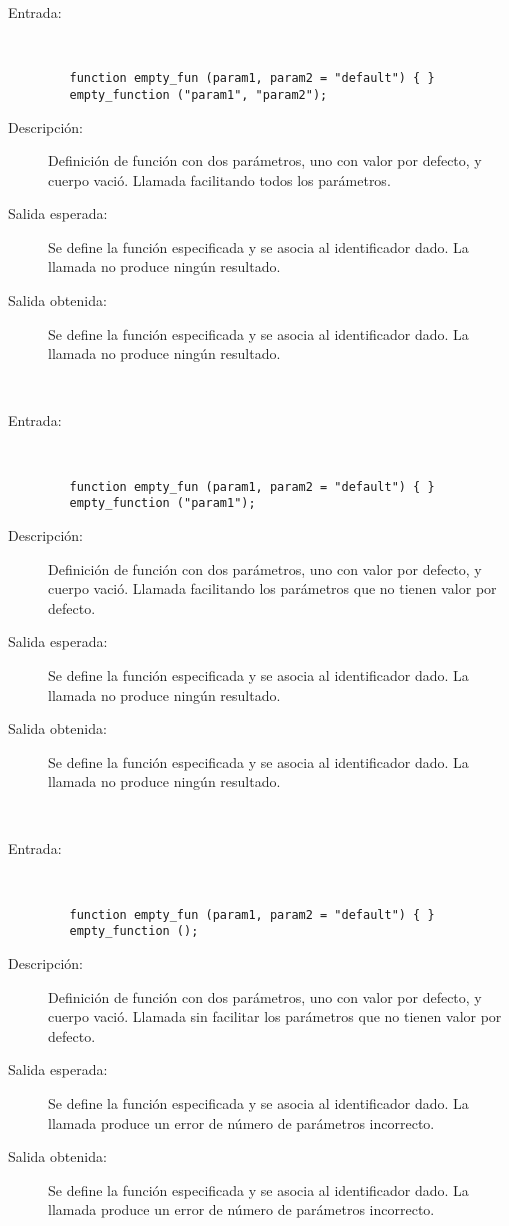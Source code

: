 	\begin{description}
		\item [Entrada:] \hfill \\
\begin{lstlisting}
   function empty_fun (param1, param2 = "default") { } 
   empty_function ("param1", "param2");
\end{lstlisting}
		\item [Descripción:] Definición de función con dos parámetros, uno con valor por defecto, y cuerpo vació. Llamada facilitando todos los parámetros.
		\item [Salida esperada:] Se define la función especificada y se asocia al identificador dado. La llamada no produce ningún resultado.
		\item [Salida obtenida:] Se define la función especificada y se asocia al identificador dado. La llamada no produce ningún resultado.
	\end{description}
\hfil \\
	\begin{description}
		\item [Entrada:] \hfill \\
\begin{lstlisting}
   function empty_fun (param1, param2 = "default") { } 
   empty_function ("param1");
\end{lstlisting}
		\item [Descripción:] Definición de función con dos parámetros, uno con valor por defecto, y cuerpo vació. Llamada facilitando los parámetros que no tienen valor por defecto.
		\item [Salida esperada:] Se define la función especificada y se asocia al identificador dado. La llamada no produce ningún resultado.
		\item [Salida obtenida:] Se define la función especificada y se asocia al identificador dado. La llamada no produce ningún resultado.
	\end{description}
\hfil \\
	\begin{description}
		\item [Entrada:] \hfill \\
\begin{lstlisting}
   function empty_fun (param1, param2 = "default") { } 
   empty_function ();
\end{lstlisting}
		\item [Descripción:] Definición de función con dos parámetros, uno con valor por defecto, y cuerpo vació. Llamada sin facilitar los parámetros que no tienen valor por defecto.
		\item [Salida esperada:] Se define la función especificada y se asocia al identificador dado. La llamada produce un error de número de parámetros incorrecto.
		\item [Salida obtenida:] Se define la función especificada y se asocia al identificador dado. La llamada produce un error de número de parámetros incorrecto.
	\end{description}
